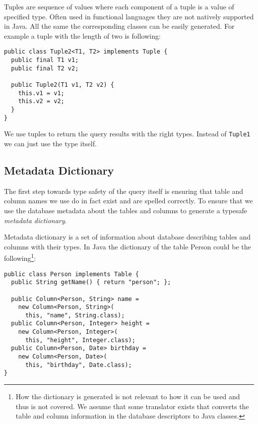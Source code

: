 \documentclass{sig-alternate}
\begin{document}
Tuples are sequence of values where each component of a tuple is a value of specified type. Often used in functional languages they are not natively supported in Java. All the same the corresponding classes can be easily generated. For example a tuple with the length of two is following:

\begin{verbatim}
public class Tuple2<T1, T2> implements Tuple {
  public final T1 v1;
  public final T2 v2;

  public Tuple2(T1 v1, T2 v2) {
    this.v1 = v1;
    this.v2 = v2;
  }		
}
\end{verbatim}

We use tuples to return the query results with the right types. Instead of \verb!Tuple1! we can just use the type itself.

\subsection{Metadata Dictionary}

The first step towards type safety of the query itself is ensuring that table and column names we use do in fact exist and are spelled correctly. To ensure that we use the database metadata about the tables and columns to generate a typesafe \emph{metadata dictionary}.

Metadata dictionary is a set of information about database describing tables and columns with their types. In Java the dictionary of the table Person could be the following\footnote{How the dictionary is generated is not relevant to how it can be used and thus is not covered. We assume that some translator exists that converts the table and column information in the database descriptors to Java classes.}:

\begin{verbatim}
public class Person implements Table {
  public String getName() { return "person"; };

  public Column<Person, String> name = 
    new Column<Person, String>(
      this, "name", String.class);
  public Column<Person, Integer> height = 
    new Column<Person, Integer>(
      this, "height", Integer.class);
  public Column<Person, Date> birthday = 
    new Column<Person, Date>(
      this, "birthday", Date.class);
}
\end{verbatim}
\end{document}
